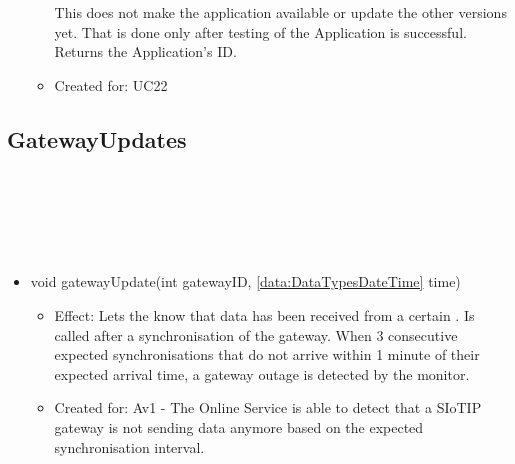 \begin{description}
\begin{itemize}[noitemsep,nolistsep,leftmargin=-.25cm]
\begin{itemize}[noitemsep,nolistsep]
This does not make the application available or update the other versions yet. That is done only after testing of the Application is successful. \\
Returns the Application's ID.
\item Created for: UC22
        \end{itemize}
    \end{itemize}
    \end{description}

  \subsection{GatewayUpdates}\label{int:OnlineServiceOnlineServiceGatewayCommunicationHandlerGatewayMonitorGatewayUpdates}
    \begin{description}
      \item[Provided by:] \iconcomponent{}~
      \item[Required by:] \iconcomponent{}~
      \item[Operations:] ~
    \begin{itemize}[noitemsep,nolistsep,leftmargin=-.25cm]
      \item \textsf{void gatewayUpdate(int gatewayID, \ref{data:DataTypesDateTime} time)}
        \begin{itemize}[noitemsep,nolistsep]
           \item Effect: Lets the  know that data has been received from a certain . Is called after a synchronisation of the gateway. When 3 consecutive expected synchronisations that do not arrive within 1 minute of their expected arrival time, a gateway outage is detected by the monitor.
\item Created for: Av1 - The Online Service is able to detect that a SIoTIP gateway is not sending data anymore based on the expected synchronisation interval.
        \end{itemize}
    \end{itemize}
    \end{description}

